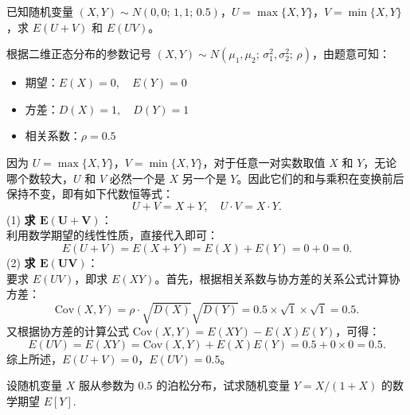 ﻿\documentclass[lang=cn,11pt]{elegantbook}
\begin{document}
\begin{exercise}\label{exer:4-s9-maxbvn}
已知随机变量 \((X,Y) \sim N(0,0;\,1,1;\,0.5)\)，\(U = \max\{X,Y\}\)，\(V = \min\{X,Y\}\)，求 \(E(U+V)\) 和 \(E(UV)\)。
\end{exercise}
\begin{solution}
根据二维正态分布的参数记号 \((X,Y) \sim N(\mu_1, \mu_2;\, \sigma_1^2, \sigma_2^2;\, \rho)\)，由题意可知：
\begin{itemize}
    \item 期望：$E(X) = 0,\quad E(Y) = 0$
    \item 方差：$D(X) = 1,\quad D(Y) = 1$
    \item 相关系数：$\rho = 0.5$
\end{itemize}
因为 $U = \max\{X,Y\}$，$V = \min\{X,Y\}$，对于任意一对实数取值 $X$ 和 $Y$，无论哪个数较大，$U$ 和 $V$ 必然一个是 $X$ 另一个是 $Y$。因此它们的和与乘积在变换前后保持不变，即有如下代数恒等式：
\[
U + V = X + Y, \quad U \cdot V = X \cdot Y.
\]
(1) \textbf{求 $\boldsymbol{E(U+V)}$}：\\
利用数学期望的线性性质，直接代入即可：
\[
E(U+V) = E(X+Y) = E(X) + E(Y) = 0 + 0 = 0.
\]
(2) \textbf{求 $\boldsymbol{E(UV)}$}：\\
要求 $E(UV)$，即求 $E(XY)$。首先，根据相关系数与协方差的关系公式计算协方差：
\[
\mathrm{Cov}(X,Y) = \rho \cdot \sqrt{D(X)} \sqrt{D(Y)} = 0.5 \times \sqrt{1} \times \sqrt{1} = 0.5.
\]
又根据协方差的计算公式 $\mathrm{Cov}(X,Y) = E(XY) - E(X)E(Y)$，可得：
\[
E(UV) = E(XY) = \mathrm{Cov}(X,Y) + E(X)E(Y) = 0.5 + 0 \times 0 = 0.5.
\]
综上所述，$E(U+V) = 0$，$E(UV) = 0.5$。
\end{solution}


\begin{exercise}
设随机变量 $X$ 服从参数为 $0.5$ 的泊松分布，试求随机变量 $Y = X/(1+X)$ 的数学期望 $E[Y]$.
\end{exercise}
\end{document}
